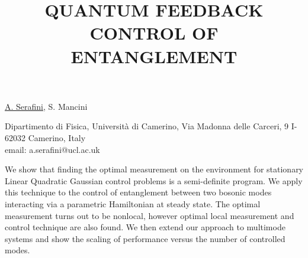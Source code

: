 \title{QUANTUM FEEDBACK CONTROL OF ENTANGLEMENT }

\underline{A. Serafini}, S. Mancini


Dipartimento di Fisica,
Universit\`{a} di Camerino,
Via Madonna delle Carceri, 9
I-62032 Camerino, Italy\\
email: a.serafini@ucl.ac.uk

We show that finding the optimal measurement on the environment for
stationary Linear Quadratic Gaussian control problems is a semi-definite program. We apply this technique to the control of entanglement between two bosonic modes interacting via a parametric Hamiltonian at steady state. The optimal measurement turns out to be nonlocal, however optimal local measurement and control technique are also found.
We then extend our approach to multimode systems and show the
scaling of performance versus the number of controlled modes.

\vspace{\baselineskip}